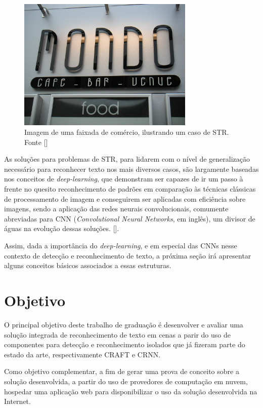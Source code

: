 \begin{figure}
    \centering
    \includegraphics[width=0.75\textwidth]{figs/img_139.jpg}
    \caption{Imagem de uma faixada de comércio, ilustrando um caso de STR. Fonte []}
    \label{fig:str-example}
\end{figure}

As soluções para problemas de STR, para lidarem com o nível de generalização necessário para reconhecer texto nos mais diversos casos, são largamente baseadas nos conceitos de \textit{deep-learning}, que demonstram ser capazes de ir um passo à frente no quesito reconhecimento de padrões em comparação às técnicas clássicas de processamento de imagem e conseguirem ser aplicadas com eficiência sobre imagens, sendo a aplicação das redes neurais convolucionais, comumente abreviadas para CNN (\textit{Convolutional Neural Networks}, em inglês), um divisor de águas na evolução dessas soluções. [].

Assim, dada a importância do \textit{deep-learning}, e em especial das CNNs nesse contexto de detecção e reconhecimento de texto, a próxima seção irá apresentar alguns conceitos básicos associados a essas estruturas.

\section{Objetivo}

O principal objetivo deste trabalho de graduação é desenvolver e avaliar uma solução integrada de reconhecimento de texto em cenas a parir do uso de componentes para detecção e reconhecimento isolados que já fizeram parte do estado da arte, respectivamente CRAFT e CRNN.

Como objetivo complementar, a fim de gerar uma prova de conceito sobre a solução desenvolvida, a partir do uso de provedores de computação em nuvem, hospedar uma aplicação web para disponibilizar o uso da solução desenvolvida na Internet.

